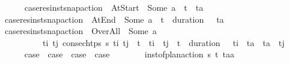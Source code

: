 \begin{isabellebody}
\ \ \ \ \isamarkupfalse%
\ {\isacharquery}{\kern0pt}case{}{\isacharequal}{\kern0pt}{\isachardoublequoteopen}res{\isacharunderscore}{\kern0pt}inst{\isacharunderscore}{\kern0pt}snap{\isacharunderscore}{\kern0pt}action\ {\isasympi}\ At{\isacharunderscore}{\kern0pt}Start\ {\isacharequal}{\kern0pt}\ Some\ a\ {\isasymand}\ t\isactrlsub {\isasympi}\ {\isacharequal}{\kern0pt}\ t\isactrlsub a{\isachardoublequoteclose}\isanewline
\ \ \ \ \isamarkupfalse%
\ {\isacharquery}{\kern0pt}case{}{\isacharequal}{\kern0pt}{\isachardoublequoteopen}res{\isacharunderscore}{\kern0pt}inst{\isacharunderscore}{\kern0pt}snap{\isacharunderscore}{\kern0pt}action\ {\isasympi}\ At{\isacharunderscore}{\kern0pt}End\ {\isacharequal}{\kern0pt}\ Some\ a\ {\isasymand}\ t\isactrlsub {\isasympi}\ {\isacharplus}{\kern0pt}\ {\isacharparenleft}{\kern0pt}duration\ {\isasympi}{\isacharparenright}{\kern0pt}\ {\isacharequal}{\kern0pt}\ t\isactrlsub a{\isachardoublequoteclose}\isanewline
\ \ \ \ \isamarkupfalse%
\ {\isacharquery}{\kern0pt}case{}{\isacharequal}{\kern0pt}{\isachardoublequoteopen}res{\isacharunderscore}{\kern0pt}inst{\isacharunderscore}{\kern0pt}snap{\isacharunderscore}{\kern0pt}action\ {\isasympi}\ Over{\isacharunderscore}{\kern0pt}All\ {\isacharequal}{\kern0pt}\ Some\ a\ {\isasymand}\ \isanewline
\ \ \ \ \ \ \ \ \ \ {\isacharparenleft}{\kern0pt}{\isasymexists}t\isactrlsub i\ t\isactrlsub j{\isachardot}{\kern0pt}\ consec{\isacharunderscore}{\kern0pt}htps\ {\isasympi}s\ t\isactrlsub i\ t\isactrlsub j\ {\isasymand}\ t\isactrlsub {\isasympi}\ {\isasymle}\ t\isactrlsub i\ {\isasymand}\ t\isactrlsub j\ {\isasymle}\ t\isactrlsub {\isasympi}\ {\isacharplus}{\kern0pt}\ {\isacharparenleft}{\kern0pt}duration\ {\isasympi}{\isacharparenright}{\kern0pt}\ {\isasymand}\ t\isactrlsub i\ {\isacharless}{\kern0pt}\ t\isactrlsub a\ {\isasymand}\ t\isactrlsub a\ {\isacharless}{\kern0pt}\ t\isactrlsub j{\isacharparenright}{\kern0pt}{\isachardoublequoteclose}\isanewline
\ \ \ \ \isamarkupfalse%
\ {\isachardoublequoteopen}{\isacharquery}{\kern0pt}case{}\ {\isasymor}\ {\isacharquery}{\kern0pt}case{}\ {\isasymor}\ {\isacharquery}{\kern0pt}case{}\ {\isasymor}\ {\isacharquery}{\kern0pt}case{}{\isachardoublequoteclose}\isanewline
\ \ \ \ \ \ \isamarkupfalse%
\ {\isacartoucheopen}inst{\isacharunderscore}{\kern0pt}of{\isacharunderscore}{\kern0pt}plan{\isacharunderscore}{\kern0pt}action\ {\isasympi}s\ {\isacharparenleft}{\kern0pt}t\isactrlsub {\isasympi}{\isacharcomma}{\kern0pt}{\isasympi}{\isacharparenright}{\kern0pt}\ {\isacharparenleft}{\kern0pt}t\isactrlsub a{\isacharcomma}{\kern0pt}a{\isacharparenright}{\kern0pt}{\isacartoucheclose}\ \isamarkupfalse%

\end{isabellebody}
